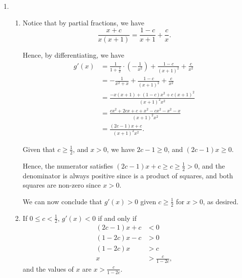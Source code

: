 \Question{\currfilebase}

\begin{enumerate}
    \item \begin{enumerate}
              \item Notice that by partial fractions, we have
                    \[
                        \frac{x + c}{x (x + 1)} = \frac{1 - c}{x + 1} + \frac{c}{x}.
                    \]

                    Hence, by differentiating, we have
                    \begin{align*}
                        g'(x) & = \frac{1}{1 + \frac{1}{x}} \cdot \left(- \frac{1}{x^2}\right) + \frac{1 - c}{(x + 1)^2} + \frac{c}{x^2} \\
                              & = - \frac{1}{x^2 + x} + \frac{1 - c}{(x + 1)^2} + \frac{c}{x^2}                                          \\
                              & = \frac{- x (x + 1) + (1 - c) x^2 + c (x + 1)^2}{(x + 1)^2 x^2}                                          \\
                              & = \frac{cx^2 + 2cx + c + x^2 - cx^2 - x^2 - x}{(x + 1)^2 x^2}                                            \\
                              & = \frac{(2c - 1)x + c}{(x + 1)^2 x^2}.
                    \end{align*}

                    Given that \(c \geq \frac{1}{2}\), and \(x > 0\), we have \(2c - 1 \geq 0\), and \((2c - 1) x \geq 0\).

                    Hence, the numerator satisfies \((2c - 1)x + c \geq c \geq \frac{1}{2} > 0\), and the denominator is always positive since is a product of squares, and both squares are non-zero since \(x > 0\).

                    We can now conclude that \(g'(x) > 0\) given \(c \geq \frac{1}{2}\) for \(x > 0\), as desired.

              \item If \(0 \leq c < \frac{1}{2}\), \(g'(x) < 0\) if and only if
                    \begin{align*}
                        (2c - 1) x + c & < 0                 \\
                        (1 - 2c) x - c & > 0                 \\
                        (1 - 2c) x     & > c                 \\
                        x              & > \frac{c}{1 - 2c},
                    \end{align*}
                    and the values of \(x\) are \(x > \frac{c}{1 - 2c}\).
          \end{enumerate}


\end{enumerate}
